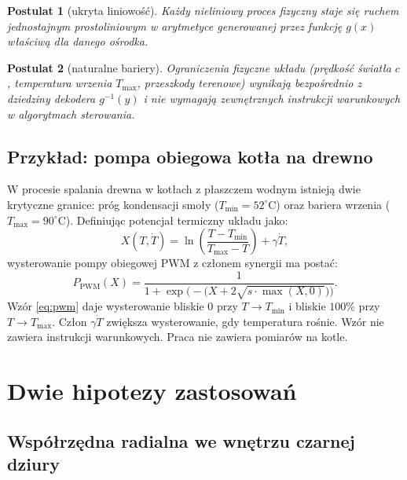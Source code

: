 \documentclass[11pt,a4paper]{article}
\theoremstyle{definition}
\theoremstyle{plain}
\newtheorem{law}{Postulat}[section]
\begin{document}
\begin{law}[ukryta liniowość]
Każdy nieliniowy proces fizyczny staje się ruchem jednostajnym prostoliniowym w arytmetyce generowanej przez funkcję $g(x)$ właściwą dla danego ośrodka.
\end{law}

\begin{law}[naturalne bariery]
Ograniczenia fizyczne układu (prędkość światła $c$, temperatura wrzenia $T_{\max}$, przeszkody terenowe) wynikają bezpośrednio z dziedziny dekodera $g^{-1}(y)$ i nie wymagają zewnętrznych instrukcji warunkowych w algorytmach sterowania.
\end{law}

\subsection{Przykład: pompa obiegowa kotła na drewno}

W procesie spalania drewna w kotłach z płaszczem wodnym istnieją dwie krytyczne granice: próg kondensacji smoły ($T_{\min} = 52^\circ\text{C}$) oraz bariera wrzenia ($T_{\max} = 90^\circ\text{C}$). Definiując potencjał termiczny układu jako:
\begin{equation}
X(T, \dot{T}) = \ln\left(\frac{T - T_{\min}}{T_{\max} - T}\right) + \gamma\dot{T},
\end{equation}
wysterowanie pompy obiegowej PWM z członem synergii ma postać:
\begin{equation}
P_{\text{PWM}}(X) = \frac{1}{1 + \exp\Big(-\big(X + 2\sqrt{s \cdot \max(X, 0)}\big)\Big)}.
\label{eq:pwm}
\end{equation}
Wzór \eqref{eq:pwm} daje wysterowanie bliskie $0$ przy $T \to T_{\min}$ i bliskie $100\%$ przy $T \to T_{\max}$. Człon $\gamma\dot{T}$ zwiększa wysterowanie, gdy temperatura rośnie. Wzór nie zawiera instrukcji warunkowych. Praca nie zawiera pomiarów na kotle.

\section{Dwie hipotezy zastosowań}

\subsection{Współrzędna radialna we wnętrzu czarnej dziury}
\end{document}
